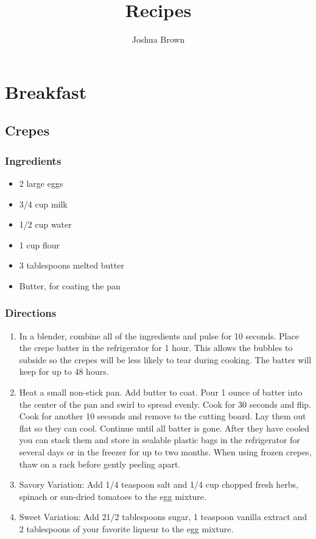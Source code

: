 \documentclass[oneside,11pt]{book}
\title{\bf \Huge Recipes}
\author{Joshua Brown}
\date{}
\newcommand{\Ingredients}[1]{
    \subsection*{Ingredients}
    \begin{itemize} 
        #1 
    \end{itemize}
}
\newcommand{\Directions}[1]{
    \subsection*{Directions}
    \begin{enumerate} 
        #1 
    \end{enumerate}
}
\newcommand{\recipe}[3]{
	\pagebreak
    \section*{ \hspace{-12pt} #1 }
    \addcontentsline{toc}{section}{ \hspace{-6pt} #1 }
	
	\begin{minipage}[t]{0.35\textwidth}
	    #2
	\end{minipage}
	\hspace{0.05\textwidth}
	\begin{minipage}[t]{0.6\textwidth}
	    #3
	\end{minipage}
}
\begin{document}
\maketitle
\tableofcontents{}

\chapter{Breakfast}
    \recipe{Crepes}{
        \Ingredients{
            \item 2 large eggs
            \item 3/4 cup milk
            \item 1/2 cup water
            \item 1 cup flour
            \item 3 tablespoons melted butter
            \item Butter, for coating the pan
        }
	}{
        \Directions{
            \item In a blender, combine all of the ingredients and pulse for 10 seconds. 
                Place the crepe batter in the refrigerator for 1 hour. 
                This allows the bubbles to subside so the crepes will be less likely to tear during cooking. 
                The batter will keep for up to 48 hours.
            \item Heat a small non-stick pan. 
                Add butter to coat. 
                Pour 1 ounce of batter into the center of the pan and swirl to spread evenly. 
                Cook for 30 seconds and flip. Cook for another 10 seconds and remove to the cutting board. 
                Lay them out flat so they can cool. 
                Continue until all batter is gone. 
                After they have cooled you can stack them and store in sealable plastic bags in the refrigerator for several days or in the freezer for up to two months. 
                When using frozen crepes, thaw on a rack before gently peeling apart.
            \item Savory Variation: Add 1/4 teaspoon salt and 1/4 cup chopped fresh herbs, spinach or sun-dried tomatoes to the egg mixture.
            \item Sweet Variation: Add 21/2 tablespoons sugar, 1 teaspoon vanilla extract and 2 tablespoons of your favorite liqueur to the egg mixture.
        }
	}
    
\end{document}
